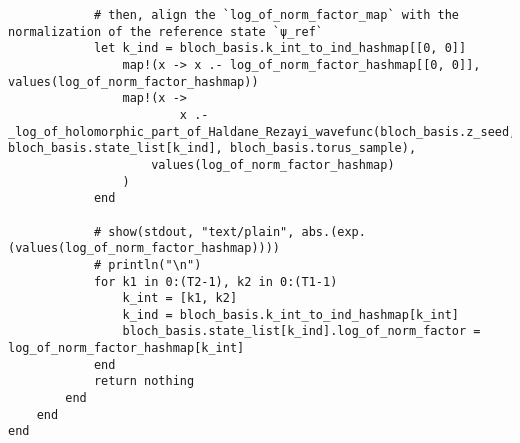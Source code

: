 \begin{verbatim}
            # then, align the `log_of_norm_factor_map` with the normalization of the reference state `ψ_ref`
            let k_ind = bloch_basis.k_int_to_ind_hashmap[[0, 0]]
                map!(x -> x .- log_of_norm_factor_hashmap[[0, 0]], values(log_of_norm_factor_hashmap))
                map!(x ->
                        x .- _log_of_holomorphic_part_of_Haldane_Rezayi_wavefunc(bloch_basis.z_seed, bloch_basis.state_list[k_ind], bloch_basis.torus_sample),
                    values(log_of_norm_factor_hashmap)
                )
            end

            # show(stdout, "text/plain", abs.(exp.(values(log_of_norm_factor_hashmap))))
            # println("\n")
            for k1 in 0:(T2-1), k2 in 0:(T1-1)
                k_int = [k1, k2]
                k_ind = bloch_basis.k_int_to_ind_hashmap[k_int]
                bloch_basis.state_list[k_ind].log_of_norm_factor = log_of_norm_factor_hashmap[k_int]
            end
            return nothing
        end
    end
end
\end{verbatim}